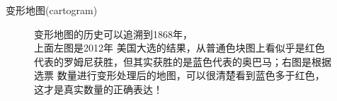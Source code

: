 \documentclass{beamerthemeMono}
\begin{document}
\begin{frame}{\subsecname}{变形地图(cartogram)}
  
  \begin{figure}\centering
    \vspace{0.5pt}
    \caption{变形地图的历史可以追溯到1868年，\\上面左图是2012年
      美国大选的结果，从普通色块图上看似乎是红色代表的罗姆尼获胜，但其实获胜的是蓝色代表的奥巴马；右图是根据选票
      数量进行变形处理后的地图，可以很清楚看到蓝色多于红色，这才是真实数量的正确表达！}
  \end{figure}
  
\end{frame}
\end{document}

